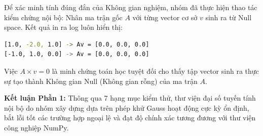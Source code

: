 Để xác minh tính đúng đắn của Không gian nghiệm, nhóm đã thực hiện thao tác kiểm chứng nội bộ: Nhân ma trận gốc $A$ với từng vector cơ sở $v$ sinh ra từ Null space. Kết quả in ra log luôn hiển thị:
\begin{lstlisting}[language=bash, numbers=none]
[1.0, -2.0, 1.0] -> Av = [0.0, 0.0, 0.0]
[-1.0, 1.0, 0.0] -> Av = [0.0, 0.0, 0.0]
\end{lstlisting}
Việc $A \times v = 0$ là minh chứng toán học tuyệt đối cho thấy tập vector sinh ra thực sự tạo thành Không gian Null (Không gian rỗng) của ma trận $A$.

\textbf{Kết luận Phần 1:} Thông qua 7 hạng mục kiểm thử, thư viện đại số tuyến tính nội bộ do nhóm xây dựng dựa trên phép khử Gauss hoạt động cực kỳ ổn định, bắt lỗi tốt các trường hợp ngoại lệ và đạt độ chính xác tương đương với thư viện công nghiệp NumPy.